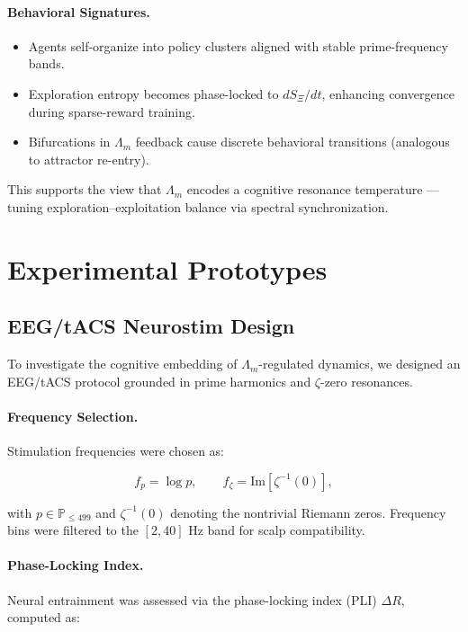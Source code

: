 \documentclass{article}
\theoremstyle{plain}
\theoremstyle{claimstyle}
\begin{document}
\paragraph{Behavioral Signatures.}
\begin{itemize}
    \item Agents self-organize into policy clusters aligned with stable prime-frequency bands.
    \item Exploration entropy becomes phase-locked to $dS_\Xi/dt$, enhancing convergence during sparse-reward training.
    \item Bifurcations in $\Lambda_m$ feedback cause discrete behavioral transitions (analogous to attractor re-entry).
\end{itemize}

This supports the view that $\Lambda_m$ encodes a cognitive resonance temperature — tuning exploration–exploitation balance via spectral synchronization.

\section{Experimental Prototypes}

\subsection{EEG/tACS Neurostim Design}

To investigate the cognitive embedding of $\Lambda_m$-regulated dynamics, we designed an EEG/tACS protocol grounded in prime harmonics and $\zeta$-zero resonances.

\paragraph{Frequency Selection.} Stimulation frequencies were chosen as:

\begin{equation}
f_p = \log p, \qquad f_\zeta = \text{Im}[\zeta^{-1}(0)],
\end{equation}

with $p \in \mathbb{P}_{\leq 499}$ and $\zeta^{-1}(0)$ denoting the nontrivial Riemann zeros. Frequency bins were filtered to the $[2, 40]$ Hz band for scalp compatibility.

\paragraph{Phase-Locking Index.} Neural entrainment was assessed via the phase-locking index (PLI) $\Delta R$, computed as:
\end{document}
